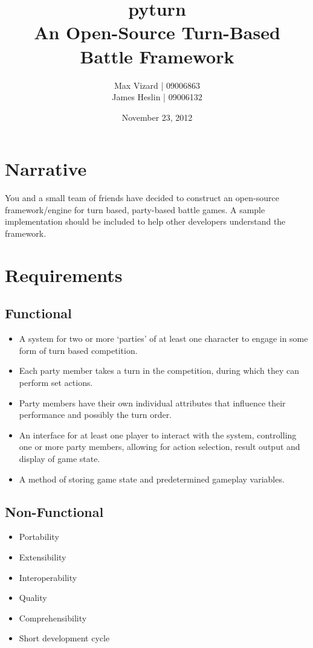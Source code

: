 \documentclass[11pt]{report}
\title{\textbf{pyturn}\\
An Open-Source Turn-Based Battle Framework}
\author{Max Vizard | 09006863\\
		James Heslin | 09006132\\}
\date{November 23, 2012}
\begin{document}
\maketitle

\tableofcontents{}
\pagebreak

\section{Narrative}
You and a small team of friends have decided to construct an open-source framework/engine for turn based, party-based battle games. A sample implementation should be included to help other developers understand the framework. 

\section{Requirements}
	\subsection{Functional}
	\begin{itemize}
			\item{A system for two or more ‘parties’ of at least one character to engage in some form of turn based competition.}
			\item{Each party member takes a turn in the competition, during which they can perform set actions.}
			\item{Party members have their own individual attributes that influence their performance and possibly the turn order.}
			\item{An interface for at least one player to interact with the system, controlling one or more party members, allowing for action selection, result output and display of game state.}
			\item{A method of storing game state and predetermined gameplay variables.}
	\end{itemize}
	\subsection{Non-Functional}
	\begin{itemize}
		\item{Portability}
		\item{Extensibility}
		\item{Interoperability}
		\item{Quality}
		\item{Comprehensibility}
		\item{Short development cycle}
	\end{itemize}
\end{document}
